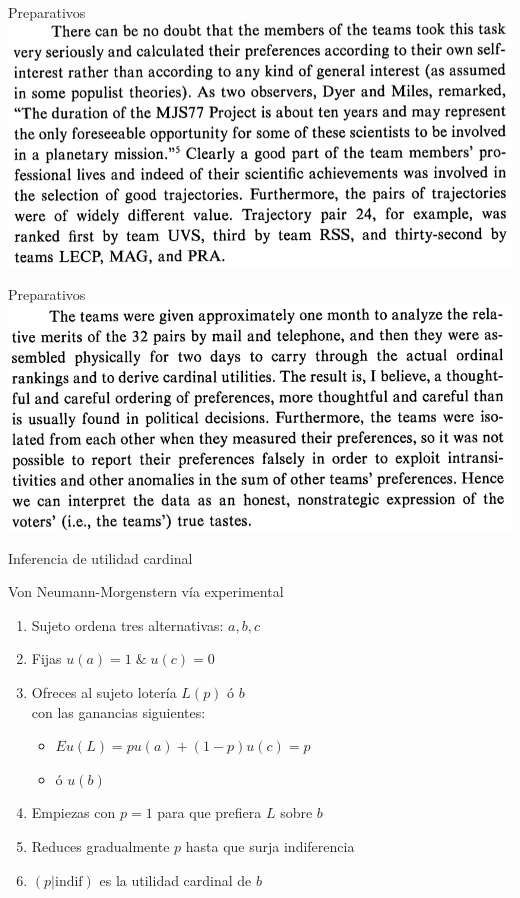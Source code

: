 \documentclass[bigger]{beamer}
\begin{document}
\begin{frame}[label={sec:org7128542}]{Preparativos}
\centering
\includegraphics[width=\textwidth]{./pics/rk1.png}
\end{frame}
\begin{frame}[label={sec:org0be7064}]{Preparativos}
\centering
\includegraphics[width=\textwidth]{./pics/rk2.png}
\end{frame}
\begin{frame}[<+->][label={sec:org6949743}]{Inferencia de utilidad cardinal}
\begin{block}{Von Neumann-Morgenstern vía experimental}
\begin{enumerate}
\item Sujeto ordena tres alternativas: \(a,b,c\)
\item Fijas \(u(a)=1\;\&\;u(c)=0\)
\item Ofreces al sujeto lotería \(L(p)\) ó \(b\) \\[0pt]
con las ganancias siguientes:
\begin{itemize}
\item \(Eu(L) = pu(a) + (1-p)u(c) = p\)
\item ó \(u(b)\)
\end{itemize}
\item Empiezas con \(p=1\) para que prefiera \(L\) sobre \(b\)
\item Reduces gradualmente \(p\) hasta que surja indiferencia
\item \((p|\text{indif})\) es la utilidad cardinal de \(b\)
\end{enumerate}
\end{block}
\end{frame}
\end{document}
